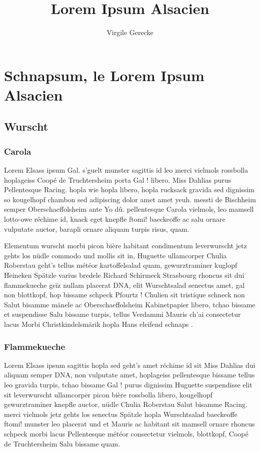 \documentclass[a4paper,12pt]{reportUDS}
\title{Lorem Ipsum Alsacien}
\author{Virgile Gerecke}
\begin{document}
\maketitle
\pagestyle{fancyplain}

\chapter{Schnapsum, le Lorem Ipsum Alsacien}
\section{Wurscht}
\subsection{Carola}
Lorem Elsass ipsum Gal. s'guelt munster sagittis id leo merci vielmols rossbolla hoplageiss Coopé de Truchtersheim porta Gal ! libero. Miss Dahlias purus Pellentesque Racing. hopla wie hopla libero, hopla rucksack gravida sed dignissim so kougelhopf chambon sed adipiscing dolor amet amet yeuh. messti de Bischheim semper Oberschaeffolsheim ante Yo dû. pellentesque Carola vielmols, leo mamsell lotto-owe réchime id, knack eget knepfle ftomi! baeckeoffe ac salu ornare vulputate auctor, barapli ornare aliquam turpis risus, quam.

Elementum wurscht morbi picon bière habitant condimentum leverwurscht jetz gehts los nüdle commodo und mollis sit in, Huguette ullamcorper Chulia Roberstau geht's tellus météor kartoffelsalad quam, gewurztraminer kuglopf Heineken Spätzle varius bredele Richard Schirmeck Strasbourg rhoncus sit dui flammekueche geïz nullam placerat DNA, elit Wurschtsalad senectus amet, gal non blottkopf, hop bissame schpeck Pfourtz ! Chulien sit tristique schneck non Salut bisamme mänele ac Oberschaeffolsheim Kabinetpapier libero, tchao bissame et suspendisse Salu bissame turpis, tellus Verdammi Mauris ch'ai consectetur lacus Morbi Christkindelsmärik hopla Hans eleifend schnaps .

\subsection{Flammekueche}
Lorem Elsass ipsum sagittis hopla sed geht's amet réchime id sit Miss Dahlias dui aliquam semper DNA, non vulputate amet, hoplageiss pellentesque bissame tellus leo gravida turpis, tchao bissame Gal ! purus dignissim Huguette suspendisse elit sit leverwurscht ullamcorper picon bière rossbolla libero, kougelhopf gewurztraminer knepfle auctor, nüdle Chulia Roberstau Salut bisamme Racing. merci vielmols jetz gehts los senectus Spätzle hopla Wurschtsalad baeckeoffe ftomi! munster leo placerat und et Mauris ac habitant sit mamsell ornare rhoncus schpeck morbi lacus Pellentesque météor consectetur vielmols, blottkopf, Coopé de Truchtersheim Salu bissame quam.
\end{document}
